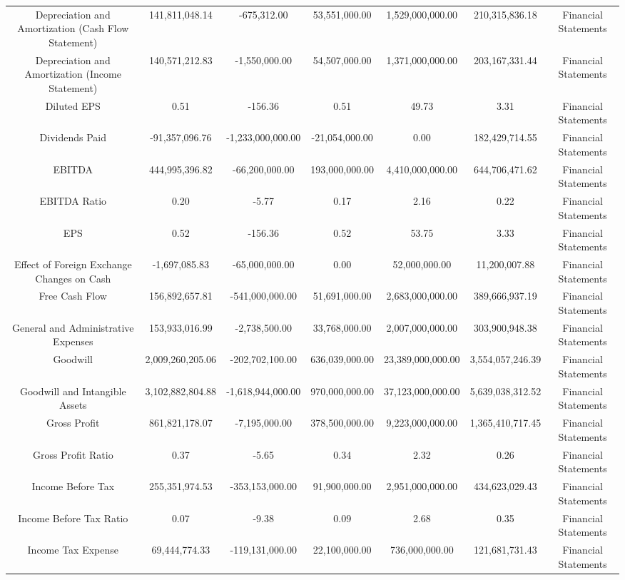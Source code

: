 \begin{longtable}{ccccccc}
Depreciation and Amortization (Cash Flow Statement) & 141,811,048.14 & -675,312.00 & 53,551,000.00 & 1,529,000,000.00 & 210,315,836.18 & Financial Statements \\
Depreciation and Amortization (Income Statement) & 140,571,212.83 & -1,550,000.00 & 54,507,000.00 & 1,371,000,000.00 & 203,167,331.44 & Financial Statements \\
Diluted EPS & 0.51 & -156.36 & 0.51 & 49.73 & 3.31 & Financial Statements \\
Dividends Paid & -91,357,096.76 & -1,233,000,000.00 & -21,054,000.00 & 0.00 & 182,429,714.55 & Financial Statements \\
EBITDA & 444,995,396.82 & -66,200,000.00 & 193,000,000.00 & 4,410,000,000.00 & 644,706,471.62 & Financial Statements \\
EBITDA Ratio & 0.20 & -5.77 & 0.17 & 2.16 & 0.22 & Financial Statements \\
EPS & 0.52 & -156.36 & 0.52 & 53.75 & 3.33 & Financial Statements \\
Effect of Foreign Exchange Changes on Cash & -1,697,085.83 & -65,000,000.00 & 0.00 & 52,000,000.00 & 11,200,007.88 & Financial Statements \\
Free Cash Flow & 156,892,657.81 & -541,000,000.00 & 51,691,000.00 & 2,683,000,000.00 & 389,666,937.19 & Financial Statements \\
General and Administrative Expenses & 153,933,016.99 & -2,738,500.00 & 33,768,000.00 & 2,007,000,000.00 & 303,900,948.38 & Financial Statements \\
Goodwill & 2,009,260,205.06 & -202,702,100.00 & 636,039,000.00 & 23,389,000,000.00 & 3,554,057,246.39 & Financial Statements \\
Goodwill and Intangible Assets & 3,102,882,804.88 & -1,618,944,000.00 & 970,000,000.00 & 37,123,000,000.00 & 5,639,038,312.52 & Financial Statements \\
Gross Profit & 861,821,178.07 & -7,195,000.00 & 378,500,000.00 & 9,223,000,000.00 & 1,365,410,717.45 & Financial Statements \\
Gross Profit Ratio & 0.37 & -5.65 & 0.34 & 2.32 & 0.26 & Financial Statements \\
Income Before Tax & 255,351,974.53 & -353,153,000.00 & 91,900,000.00 & 2,951,000,000.00 & 434,623,029.43 & Financial Statements \\
Income Before Tax Ratio & 0.07 & -9.38 & 0.09 & 2.68 & 0.35 & Financial Statements \\
Income Tax Expense & 69,444,774.33 & -119,131,000.00 & 22,100,000.00 & 736,000,000.00 & 121,681,731.43 & Financial Statements \\

\end{longtable}
